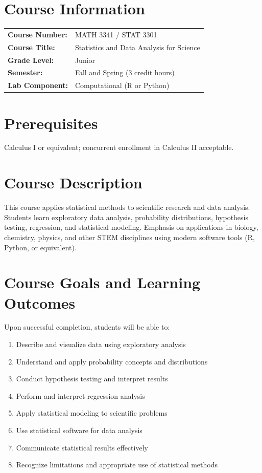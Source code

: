 \documentclass[12pt,oneside]{book}
\begin{document}
\section{Course Information}

\begin{tabular}{ll}
\textbf{Course Number:} & MATH 3341 / STAT 3301 \\
\textbf{Course Title:} & Statistics and Data Analysis for Science \\
\textbf{Grade Level:} & Junior \\
\textbf{Semester:} & Fall and Spring (3 credit hours) \\
\textbf{Lab Component:} & Computational (R or Python) \\
\end{tabular}

\section{Prerequisites}

Calculus I or equivalent; concurrent enrollment in Calculus II acceptable.

\section{Course Description}

This course applies statistical methods to scientific research and data analysis. Students learn exploratory data analysis, probability distributions, hypothesis testing, regression, and statistical modeling. Emphasis on applications in biology, chemistry, physics, and other STEM disciplines using modern software tools (R, Python, or equivalent).

\section{Course Goals and Learning Outcomes}

Upon successful completion, students will be able to:

\begin{enumerate}
    \item Describe and visualize data using exploratory analysis
    \item Understand and apply probability concepts and distributions
    \item Conduct hypothesis testing and interpret results
    \item Perform and interpret regression analysis
    \item Apply statistical modeling to scientific problems
    \item Use statistical software for data analysis
    \item Communicate statistical results effectively
    \item Recognize limitations and appropriate use of statistical methods
\end{enumerate}
\end{document}
